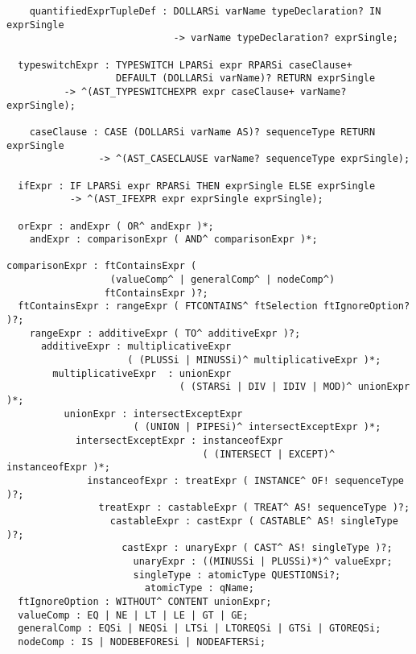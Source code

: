 \begin{verbatim}
    quantifiedExprTupleDef : DOLLARSi varName typeDeclaration? IN exprSingle
                             -> varName typeDeclaration? exprSingle;

  typeswitchExpr : TYPESWITCH LPARSi expr RPARSi caseClause+ 
                   DEFAULT (DOLLARSi varName)? RETURN exprSingle
          -> ^(AST_TYPESWITCHEXPR expr caseClause+ varName? exprSingle);

    caseClause : CASE (DOLLARSi varName AS)? sequenceType RETURN exprSingle
                -> ^(AST_CASECLAUSE varName? sequenceType exprSingle);

  ifExpr : IF LPARSi expr RPARSi THEN exprSingle ELSE exprSingle
           -> ^(AST_IFEXPR expr exprSingle exprSingle);

  orExpr : andExpr ( OR^ andExpr )*;
    andExpr : comparisonExpr ( AND^ comparisonExpr )*;

comparisonExpr : ftContainsExpr ( 
                  (valueComp^ | generalComp^ | nodeComp^) 
                 ftContainsExpr )?;
  ftContainsExpr : rangeExpr ( FTCONTAINS^ ftSelection ftIgnoreOption? )?;
    rangeExpr : additiveExpr ( TO^ additiveExpr )?;
      additiveExpr : multiplicativeExpr 
                     ( (PLUSSi | MINUSSi)^ multiplicativeExpr )*;
        multiplicativeExpr  : unionExpr 
                              ( (STARSi | DIV | IDIV | MOD)^ unionExpr )*;
          unionExpr : intersectExceptExpr 
                      ( (UNION | PIPESi)^ intersectExceptExpr )*;
            intersectExceptExpr : instanceofExpr 
                                  ( (INTERSECT | EXCEPT)^ instanceofExpr )*;
              instanceofExpr : treatExpr ( INSTANCE^ OF! sequenceType )?;
                treatExpr : castableExpr ( TREAT^ AS! sequenceType )?;
                  castableExpr : castExpr ( CASTABLE^ AS! singleType )?;
                    castExpr : unaryExpr ( CAST^ AS! singleType )?;
                      unaryExpr : ((MINUSSi | PLUSSi)*)^ valueExpr;
                      singleType : atomicType QUESTIONSi?;
                        atomicType : qName;
  ftIgnoreOption : WITHOUT^ CONTENT unionExpr;
  valueComp : EQ | NE | LT | LE | GT | GE;
  generalComp : EQSi | NEQSi | LTSi | LTOREQSi | GTSi | GTOREQSi;
  nodeComp : IS | NODEBEFORESi | NODEAFTERSi;


\end{verbatim}
